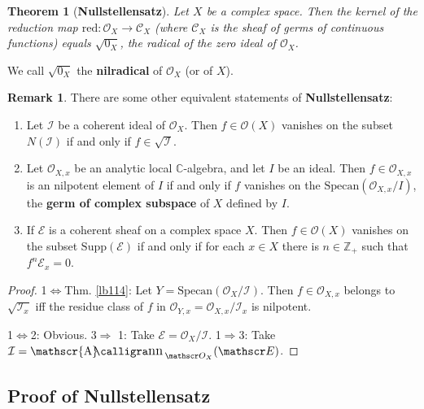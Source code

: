\documentclass[12pt,b5paper,notitlepage]{report}
\theoremstyle{definition}
\newtheorem{rem}[df]{Remark}
\theoremstyle{plain}
\newtheorem{thm}[df]{Theorem}
\DeclareMathOperator{\sann}{\mathscr{A}\text{\kern -3pt {\calligra\large nn}}\,}
\newcommand{\mc}{\mathcal}
\newcommand{\scr}{\mathscr}
\newcommand{\Cbb}{\mathbb C}
\newcommand{\Zbb}{\mathbb Z}
\newcommand{\Supp}{\mathrm{Supp}}
\newcommand{\Specan}{\mathrm{Specan}}
\newcommand{\red}{\mathrm{red}}
\numberwithin{equation}{section}
\begin{document}
\begin{thm}[\textbf{Nullstellensatz}]
Let $X$ be a complex space. Then the kernel of the reduction map $\red:\scr O_X\rightarrow\scr C_X$ (where $\scr C_X$ is the sheaf of germs of continuous functions) equals $\sqrt{0_X}$, the radical of the zero ideal of $\scr O_X$.
\end{thm}

We call $\sqrt{0_X}$ the \textbf{nilradical} of $\scr O_X$ (or of $X$). 



\begin{rem}\label{lb115}
There are some other equivalent statements of \textbf{Nullstellensatz}:
\begin{enumerate}
\item Let $\mc I$ be a coherent ideal of $\scr O_X$. Then $f\in\scr O(X)$ vanishes on the subset $N(\mc I)$ if and only if $f\in\sqrt{\mc I}$.
\item Let $\scr O_{X,x}$ be an analytic local $\Cbb$-algebra, and let $I$ be an ideal. Then $f\in\scr O_{X,x}$ is an nilpotent element of $I$ if and only if $f$ vanishes on the $\Specan(\scr O_{X,x}/I)$, the \textbf{germ of complex subspace} of $X$ defined by $I$. 

\item If $\scr E$ is a coherent sheaf on a complex space $X$. Then $f\in\scr O(X)$ vanishes on the subset $\Supp(\scr E)$ if and only if for each $x\in X$ there is $n\in\Zbb_+$ such that $f^n\scr E_x=0$.
\end{enumerate}
\end{rem}

\begin{proof}
1$\Leftrightarrow$Thm. \ref{lb114}: Let $Y=\Specan(\scr O_X/\mc I)$. Then $f\in\scr O_{X,x}$ belongs to $\sqrt{\mc I_x}$ iff  the residue class of $f$ in $\scr O_{Y,x}=\scr O_{X,x}/\mc I_x$ is nilpotent. 

1$\Leftrightarrow$2: Obvious. 3$\Rightarrow$ 1: Take $\scr E=\scr O_X/\mc I$. 1$\Rightarrow$3: Take $\mc I=\sann_{\scr O_X}(\scr E)$.
\end{proof}









\subsection{Proof of Nullstellensatz}
\end{document}
